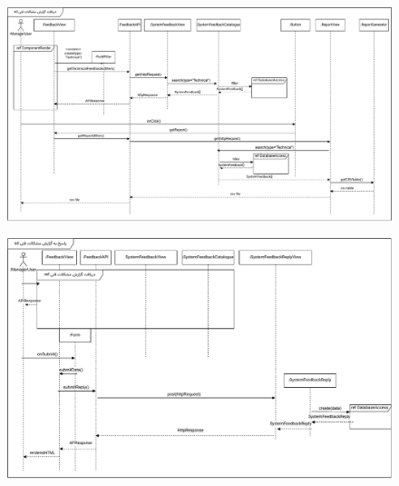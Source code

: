 \FloatBarrier
\begin{figure}[ht!]
	\centering
	\includegraphics[scale=0.8]{figs/design-sequence/3-39.pdf}
\end{figure}
\FloatBarrier
\newpage

\eject \pdfpagewidth=11in \pdfpageheight=9in


\begin{figure}[ht!]
	\centering
	\includegraphics[scale=0.8]{figs/design-sequence/3-40.pdf}
\end{figure}

\FloatBarrier
\newpage


\eject \pdfpagewidth=15in \pdfpageheight=11in


